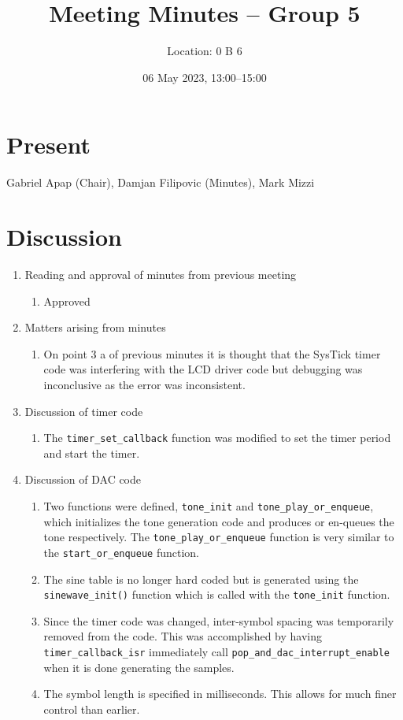 \documentclass[11pt,a4paper]{scrartcl}
\title{Meeting Minutes -- Group 5}
\author{Location: 0 B 6}
\date{06 May 2023, 13:00--15:00}
\begin{document}
\maketitle

\section*{Present}
Gabriel Apap (Chair),
Damjan Filipovic (Minutes),
Mark Mizzi 

\section*{Discussion}

\begin{enumerate}
\item Reading and approval of minutes from previous meeting
\begin{enumerate}
    \item Approved
\end{enumerate}

\item Matters arising from minutes
\begin{enumerate}
    \item On point 3 a of previous minutes it is thought that the SysTick timer code was interfering with the LCD driver code but debugging was inconclusive as the error was inconsistent.
\end{enumerate}

\item Discussion of timer code
\begin{enumerate}
    \item The \verb!timer_set_callback! function was modified to set the timer period and start the timer.
\end{enumerate}

\item Discussion of DAC code
\begin{enumerate}
    \item Two functions were defined, \verb!tone_init! and \verb!tone_play_or_enqueue!, which initializes the tone generation code and produces or en-queues the tone respectively. The \verb!tone_play_or_enqueue! function is very similar to the \verb!start_or_enqueue! function.
    \item The sine table is no longer hard coded but is generated using the \verb!sinewave_init()! function which is called with the \verb!tone_init! function.
    \item Since the timer code was changed, inter-symbol spacing was temporarily removed from the code. This was accomplished by having \verb!timer_callback_isr! immediately call \verb!pop_and_dac_interrupt_enable! when it is done generating the samples.
    \item The symbol length is specified in milliseconds. This allows for much finer control than earlier.
\end{enumerate}


\end{enumerate}
\end{document}
